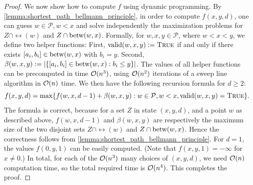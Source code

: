 \begin{proof}
We now show how to compute $f$ using dynamic programming. By \cref{lemma:shortest_path_bellmann_principle}, in order to compute $f(x,y,d)$, one can guess $w \in \mathcal{P}, w < x$ and solve independently the maximization problems for $Z \cap \rel(w)$ and $Z \cap \operatorname{\text{betw}}(w,x)$. Formally, for $w,x,y \in \mathcal{P}$, where $w < x < y$, we define two helper functions: First, $\operatorname{\text{valid}}(w,x,y) := \textsc{True}$ if and only if there exists $[a_i, b_i] \in \operatorname{\text{betw}}(w,x)$ with $b_i = y$. Second, $\beta(w,x,y) := |\{ [a_i, b_i] \in \operatorname{\text{betw}}(w,x) : b_i \leq y \}|$. The values of all helper functions can be precomputed in time $\mathcal{O}(n^3)$, using $\mathcal{O}(n^2)$ iterations of a sweep line algorithm in $\mathcal{O}(n)$ time.
We then have the following recursion formula for $d \geq 2$:
\[f(x,y,d) = \max\{ f(w,x,d-1) + \beta(w,x,y) : w \in \mathcal{P}, w < x, \operatorname{\text{valid}}(w,x,y) = \textsc{True} \}.
\]
The formula is correct, because for a set $Z$ in state $(x, y, d)$, and a point $w$ as described above, $f(w, x, d-1)$ and $\beta(w, x, y)$ are respectively the maximum size of the two disjoint sets $Z \cap \rel(w)$ and $Z \cap \operatorname{\text{betw}}(w, x)$.
Hence the correctness follows from \cref{lemma:shortest_path_bellmann_principle}.
For $d = 1$, the values $f(0, y, 1)$ can be easily computed. (Note that $f(x,y,1) = -\infty$ for $x \neq 0$.) In total, for each of the $\mathcal{O}(n^3)$ many choices of $(x, y, d)$, we need $\mathcal{O}(n)$ computation time, so the total required time is $\mathcal{O}(n^4)$. This completes the proof.
\end{proof}


